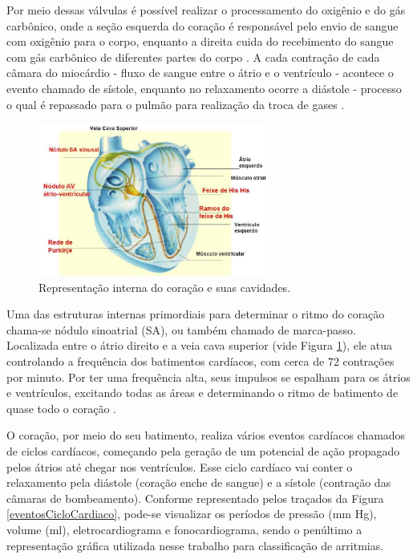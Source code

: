 \documentclass[conference]{IEEEtran}
\begin{document}
Por meio dessas válvulas é possível realizar o processamento do oxigênio e do gás carbônico, onde a seção esquerda do coração é responsável pelo envio de sangue com oxigênio para o corpo, enquanto a direita cuida do recebimento do sangue com gás carbônico de diferentes partes do corpo \cite{nih11}. A cada contração de cada câmara do miocárdio - fluxo de sangue entre o átrio e o ventrículo - acontece o evento chamado de sístole, enquanto no relaxamento ocorre a diástole - processo o qual é repassado para o pulmão para realização da troca de gases \cite{nih11}.

\begin{figure}[!h]
	\centering
	\includegraphics[width=3in]{img/coracaoEsquematico}
	\caption{Representação interna do coração e suas cavidades.}
	\label{coracaoEsquematico}
\end{figure}

Uma das estruturas internas primordiais para determinar o ritmo do coração chama-se nódulo sinoatrial (SA), ou também chamado de marca-passo. Localizada entre o átrio direito e a veia cava superior (vide Figura \ref{coracaoEsquematico}), ele atua controlando a frequência dos batimentos cardíacos, com cerca de 72 contrações por minuto. Por ter uma frequência alta, seus impulsos se espalham para os átrios e ventrículos, excitando todas as áreas e determinando o ritmo de batimento de quase todo o coração  \cite{guyton06}.

O coração, por meio do seu batimento, realiza vários eventos cardíacos chamados de ciclos cardíacos, começando pela geração de um potencial de ação propagado pelos átrios até chegar nos ventrículos. Esse ciclo cardíaco vai conter o relaxamento pela diástole (coração enche de sangue) e a sístole (contração das câmaras de bombeamento). Conforme representado pelos traçados da Figura \ref{eventosCicloCardiaco}, pode-se visualizar os períodos de pressão (mm Hg), volume (ml), eletrocardiograma e fonocardiograma, sendo o penúltimo a representação gráfica utilizada nesse trabalho para classificação de arritmias.
\end{document}
